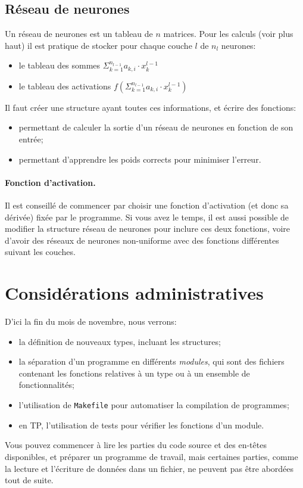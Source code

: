\documentclass[a4paper]{article}
\begin{document}
\subsection{Réseau de neurones}

Un réseau de neurones est un tableau de \(n\) matrices. Pour les calculs (voir plus haut)
il est pratique de stocker pour chaque couche \(l\) de \(n_l\) neurones:
\begin{itemize}
\item le tableau des sommes \(\Sigma_{k=1}^{n_{l-1}} a_{k,i}\cdot x^{l-1}_k\)
\item le tableau des activations \(f(\Sigma_{k=1}^{n_{l-1}} a_{k,i}\cdot x^{l-1}_k)\)
\end{itemize}
Il faut créer une structure ayant toutes ces informations, et écrire
des fonctions:
\begin{itemize}
\item permettant de calculer la sortie d'un réseau de neurones en fonction de son entrée;
\item permettant d'apprendre les poids corrects pour minimiser l'erreur.
\end{itemize}

\paragraph{Fonction d'activation.} Il est conseillé de commencer par
choisir une fonction d'activation (et donc sa dérivée) fixée par le
programme. Si vous avez le temps, il est aussi possible de modifier la
structure \og réseau de neurones\fg{} pour inclure ces deux fonctions,
voire d'avoir des réseaux de neurones non-uniforme avec des fonctions
différentes suivant les couches. 


\section{Considérations administratives}

D'ici la fin du mois de novembre, nous verrons:
\begin{itemize}
\item la définition de nouveaux types, incluant les structures;
\item la séparation d'un programme en différents \emph{modules}, qui
  sont des fichiers contenant les fonctions relatives à un type ou à
  un ensemble de fonctionnalités;
\item l'utilisation de \texttt{Makefile} pour automatiser la
  compilation de programmes;
\item en TP, l'utilisation de tests pour vérifier les fonctions d'un
  module.
\end{itemize}
Vous pouvez commencer à lire les parties du code source et des
en-têtes disponibles, et préparer un programme de travail, mais
certaines parties, comme la lecture et l'écriture de données dans un
fichier, ne peuvent pas être abordées tout de suite.
\end{document}

